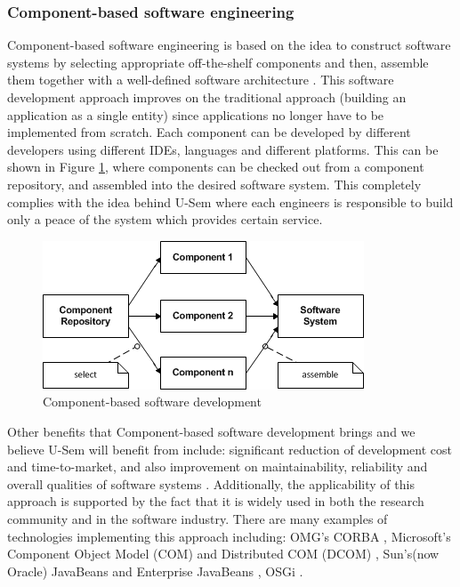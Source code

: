 \subsubsection{Component-based software engineering}

Component-based software engineering is based on the idea to construct software systems by selecting appropriate off-the-shelf components and then, assemble them together with a well-defined software architecture \cite{pour1998component}. This software development approach improves on the traditional approach (building an application as a single entity) since applications no longer have to be implemented from scratch. Each component can be developed by different developers using different IDEs, languages and different platforms. This can be shown in Figure \ref{fig_cbsd}, where components can be checked out from a component repository, and assembled into the desired software system. This completely complies with the idea behind U-Sem where each engineers is responsible to build only a peace of the system which provides certain service.

\begin{figure}[h!]
  \centering
  	\includegraphics[scale=0.75]{plug-in/component-based.png}
  \caption{Component-based software development \cite{pour1998component} }
  \label{fig_cbsd}
\end{figure}

Other benefits that Component-based software development brings and we believe U-Sem will benefit from include: significant reduction of development cost and time-to-market, and also improvement on maintainability, reliability and overall qualities of software systems \cite{pour1999enterprise} \cite{pour1999making}. Additionally, the applicability of this approach is supported by the fact that it is widely used in both the research community and in the software industry. There are many examples of technologies implementing this approach including: OMG's CORBA \cite{vinoski1997corba},  Microsoft's Component Object Model (COM) and Distributed COM (DCOM) \cite{sessions1997and}, Sun's(now Oracle) JavaBeans and Enterprise JavaBeans \cite{goncalves2010enterprise}, OSGi \cite{tavares2008gentle}.


